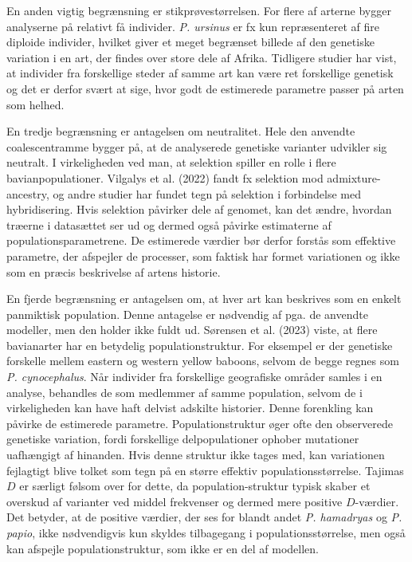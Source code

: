 \documentclass[
  10pt,
  a4paper,
]{scrbook}
\let\oldemph\emph
\renewcommand\emph[1]{\oldemph{\color{gray}#1}}
\begin{document}
En anden vigtig begrænsning er stikprøvestørrelsen. For flere af arterne
bygger analyserne på relativt få individer. \emph{P. ursinus} er fx kun
repræsenteret af fire diploide individer, hvilket giver et meget
begrænset billede af den genetiske variation i en art, der findes over
store dele af Afrika. Tidligere studier har vist, at individer fra
forskellige steder af samme art kan være ret forskellige genetisk og det
er derfor svært at sige, hvor godt de estimerede parametre passer på
arten som helhed.

En tredje begrænsning er antagelsen om neutralitet. Hele den anvendte
coalescentramme bygger på, at de analyserede genetiske varianter
udvikler sig neutralt. I virkeligheden ved man, at selektion spiller en
rolle i flere bavianpopulationer. {Vilgalys et al.} (2022) fandt fx
selektion mod admixture-ancestry, og andre studier har fundet tegn på
selektion i forbindelse med hybridisering. Hvis selektion påvirker dele
af genomet, kan det ændre, hvordan træerne i datasættet ser ud og dermed
også påvirke estimaterne af populationsparametrene. De estimerede
værdier bør derfor forstås som effektive parametre, der afspejler de
processer, som faktisk har formet variationen og ikke som en præcis
beskrivelse af artens historie.

En fjerde begrænsning er antagelsen om, at hver art kan beskrives som en
enkelt panmiktisk population. Denne antagelse er nødvendig af pga. de
anvendte modeller, men den holder ikke fuldt ud. {Sørensen et al.}
(2023) viste, at flere bavianarter har en betydelig populationstruktur.
For eksempel er der genetiske forskelle mellem eastern og western yellow
baboons, selvom de begge regnes som \emph{P. cynocephalus}. Når
individer fra forskellige geografiske områder samles i en analyse,
behandles de som medlemmer af samme population, selvom de i
virkeligheden kan have haft delvist adskilte historier. Denne forenkling
kan påvirke de estimerede parametre. Populationstruktur øger ofte den
observerede genetiske variation, fordi forskellige delpopulationer
ophober mutationer uafhængigt af hinanden. Hvis denne struktur ikke
tages med, kan variationen fejlagtigt blive tolket som tegn på en større
effektiv populationsstørrelse. Tajimas \(D\) er særligt følsom over for
dette, da population-struktur typisk skaber et overskud af varianter ved
middel frekvenser og dermed mere positive \(D\)-værdier. Det betyder, at
de positive værdier, der ses for blandt andet \emph{P. hamadryas} og
\emph{P. papio}, ikke nødvendigvis kun skyldes tilbagegang i
populationsstørrelse, men også kan afspejle populationstruktur, som ikke
er en del af modellen.
\end{document}
